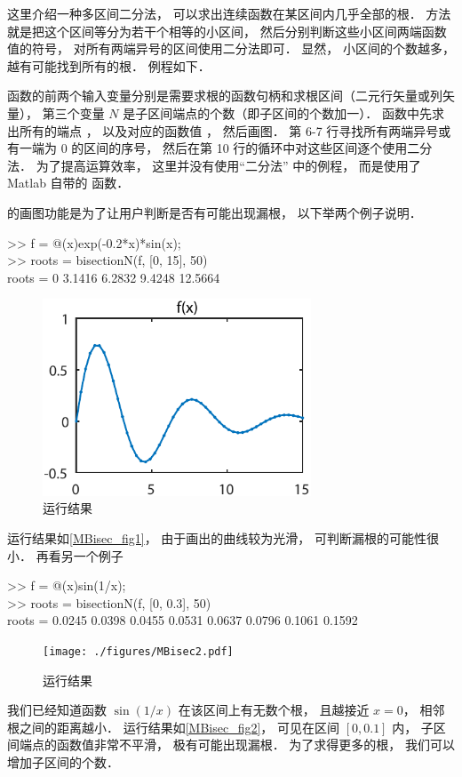 

这里介绍一种多区间二分法， 可以求出连续函数在某区间内几乎全部的根． 方法就是把这个区间等分为若干个相等的小区间， 然后分别判断这些小区间两端函数值的符号， 对所有两端异号的区间使用二分法即可． 显然， 小区间的个数越多， 越有可能找到所有的根． 例程如下．


函数的前两个输入变量分别是需要求根的函数句柄和求根区间（二元行矢量或列矢量）， 第三个变量 $N$ 是子区间端点的个数（即子区间的个数加一）． 函数中先求出所有的端点 ， 以及对应的函数值 ， 然后画图． 第 6-7 行寻找所有两端异号或有一端为 0 的区间的序号， 然后在第 10 行的循环中对这些区间逐个使用二分法． 为了提高运算效率， 这里并没有使用“二分法” 中的例程， 而是使用了 Matlab 自带的  函数．

 的画图功能是为了让用户判断是否有可能出现漏根， 以下举两个例子说明．
\begin{Command}
>> f = @(x)exp(-0.2*x)*sin(x); \\
>> roots = bisectionN(f, [0, 15], 50)\\
roots = 0    3.1416    6.2832    9.4248   12.5664
\end{Command}
\begin{figure}[ht]
\centering
\includegraphics[width=8cm]{./figures/MBisec1.pdf}
\caption{运行结果} \label{MBisec_fig1}
\end{figure}
运行结果如\autoref{MBisec_fig1}， 由于画出的曲线较为光滑， 可判断漏根的可能性很小． 再看另一个例子
\begin{Command}
>> f = @(x)sin(1/x); \\
>> roots = bisectionN(f, [0, 0.3], 50)\\
roots = 0.0245    0.0398    0.0455    0.0531    0.0637    0.0796    0.1061    0.1592
\end{Command}
\begin{figure}[ht]
\centering
\texttt{[image: ./figures/MBisec2.pdf]}
\caption{运行结果} \label{MBisec_fig2}
\end{figure}
我们已经知道函数 $\sin(1/x)$ 在该区间上有无数个根， 且越接近 $x = 0$， 相邻根之间的距离越小． 运行结果如\autoref{MBisec_fig2}，  可见在区间 $[0, 0.1]$ 内， 子区间端点的函数值非常不平滑， 极有可能出现漏根． 为了求得更多的根， 我们可以增加子区间的个数．
